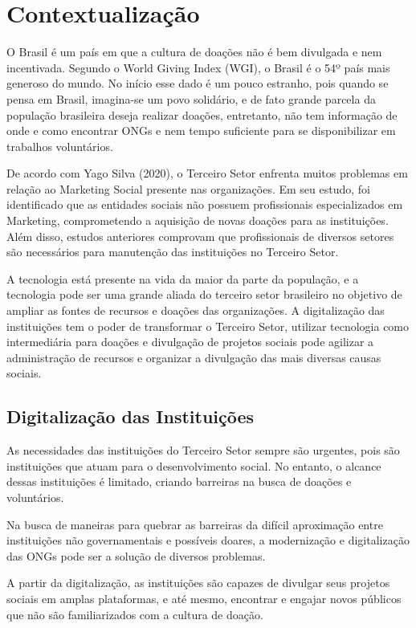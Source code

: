 \documentclass[conference]{IEEEtran}
\begin{document}
\section{Contextualização}
O Brasil é um país em que a cultura de doações não é bem divulgada e nem incentivada. Segundo o World Giving Index (WGI), o Brasil é o 54º país mais generoso do mundo. No início esse dado é um pouco estranho, pois quando se pensa em Brasil, imagina-se um povo solidário, e de fato grande parcela da população brasileira deseja realizar doações, entretanto, não tem informação de onde e como encontrar ONGs e nem tempo suficiente para se disponibilizar em trabalhos voluntários. \cite{sitepolitize01}

De acordo com Yago Silva (2020), o Terceiro Setor enfrenta muitos problemas em relação ao Marketing Social presente nas organizações. Em seu estudo, foi identificado que as entidades sociais não possuem profissionais especializados em Marketing, comprometendo a aquisição de novas doações para as instituições. Além disso, estudos anteriores comprovam que profissionais de diversos setores são necessários para manutenção das instituições no Terceiro Setor. \cite{silva2020dificuldades}

A tecnologia está presente na vida da maior da parte da população, e a tecnologia pode ser uma grande aliada do terceiro setor brasileiro no objetivo de ampliar as fontes de recursos e doações das organizações. A digitalização das instituições tem o poder de transformar o Terceiro Setor, utilizar tecnologia como intermediária para doações e divulgação de projetos sociais pode agilizar a administração de recursos e organizar a divulgação das mais diversas causas sociais.  

\subsection{Digitalização das Instituições}
As necessidades das instituições do Terceiro Setor sempre são urgentes, pois são instituições que atuam para o desenvolvimento social. No entanto, o alcance dessas instituições é limitado, criando barreiras na busca de doações e voluntários.\cite{sitecodebit}

Na busca de maneiras para quebrar as barreiras da difícil aproximação entre instituições não governamentais e possíveis doares, a modernização e digitalização das ONGs pode ser a solução de diversos problemas.

A partir da digitalização, as instituições são capazes de divulgar seus projetos sociais em amplas plataformas, e até mesmo, encontrar e engajar novos públicos que não são familiarizados com a cultura de doação. 
\end{document}
